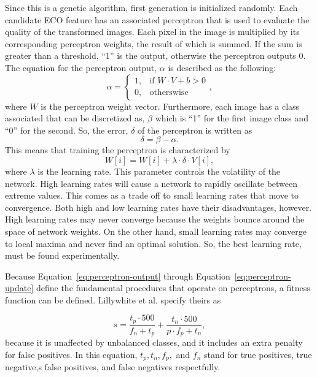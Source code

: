 \documentclass[conference]{IEEEtran}
\begin{document}
Since this is a genetic algorithm, first generation is initialized randomly. Each candidate ECO feature has an associated perceptron that is used to evaluate the quality of the transformed images. Each pixel in the image is multiplied by its corresponding perceptron weights, the result of which is summed. If the sum is greater than a threshold, ``1'' is the output, otherwise the perceptron outputs 0. The equation for the perceptron output, $\alpha$ is described as the following:
\begin{equation}
  \alpha =
  \begin{cases}
    1, & \text{if } W \cdot V + b > 0\\
    0, & \text{otherswise}
    \end{cases},
  \label{eq:perceptron-output}
\end{equation}
where $W$ is the perceptron weight vector. Furthermore, each image has a class associated that can be discretized as, $\beta$ which is ``1'' for the first image class and ``0'' for the second. So, the error, $\delta$ of the perceptron is written as
\begin{equation}
  \delta = \beta - \alpha.
  \label{eq:perceptron-error}
\end{equation}
This means that training the perceptron is characterized by
\begin{equation}
  W[i] = W[i] + \lambda \cdot \delta \cdot V[i],
  \label{eq:perceptron-update}
\end{equation}
where $\lambda$ is the learning rate. This parameter controls the volatility of the network. High learning rates will cause a network to rapidly oscillate between extreme values. This comes as a trade off to small learning rates that move to convergence. Both high and low learning rates have their disadvantages, however. High learning rates may never converge because the weights bounce around the space of network weights. On the other hand, small learning rates may converge to local maxima and never find an optimal solution. So, the best learning rate, must be found experimentally.

Because Equation~\ref{eq:perceptron-output} through Equation~\ref{eq:perceptron-update} define the fundamental procedures that operate on perceptrons, a fitness function can be defined. Lillywhite et al. specify theirs as

\begin{equation}
  s = \frac{t_p \cdot 500}{f_n + t_p} + \frac{t_n \cdot 500}{p \cdot f_p+ t_n},
  \label{eq:fitness-lilly}
\end{equation}
because it is unaffected by unbalanced classes, and it includes an extra penalty for false positives. In this equation, $t_p, t_n, f_p,$ and $f_n$ stand for true positives, true negative,s false positives, and false negatives respectfully.
\end{document}
